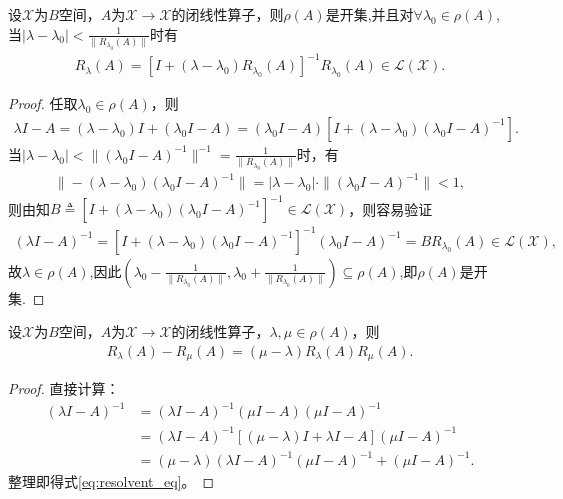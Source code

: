 \documentclass[../../main.tex]{subfiles}%
\begin{document}
\begin{corollary}
设$\mathscr{X}$为$B$空间，$A$为$\mathscr{X}\to \mathscr{X}$的闭线性算子，则$\rho(A)$是开集,并且对$\forall \lambda_0\in \rho(A)$,当$|\lambda - \lambda_0|<\frac{1}{\|R_{\lambda_0}(A)\|}$时有
\begin{align}\label{eq:rho_open}
R_{\lambda}(A)=\left[ I+\left( \lambda -\lambda _0 \right) R_{\lambda _0}\left( A \right) \right] ^{-1}R_{\lambda _0}\left( A \right) \in \mathscr{L} \left( \mathscr{X} \right) .
\end{align}
\end{corollary}
\begin{proof}
任取$\lambda_0\in\rho(A)$，则
\begin{align*}
\lambda I-A=(\lambda-\lambda_0)I+(\lambda_0 I-A)
=(\lambda_0 I-A)\left[I+(\lambda-\lambda_0)(\lambda_0 I-A)^{-1}\right].
\end{align*}
当$|\lambda-\lambda_0|<\|(\lambda_0 I-A)^{-1}\|^{-1}=\frac{1}{\|R_{\lambda_0}(A)\|}$时，有
\begin{align*}
\|-(\lambda-\lambda_0)(\lambda_0 I-A)^{-1}\|=|\lambda-\lambda_0|\cdot \|(\lambda_0 I-A)^{-1}\|<1,
\end{align*}
则由知$B\triangleq\left[I+(\lambda-\lambda_0)(\lambda_0 I-A)^{-1}\right]^{-1}\in\mathscr{L}(\mathscr{X})$，则容易验证
\begin{align*}
(\lambda I-A)^{-1}=\left[I+(\lambda-\lambda_0)(\lambda_0 I-A)^{-1}\right]^{-1}(\lambda_0 I-A)^{-1}=BR_{\lambda_0}(A)\in\mathscr{L}(\mathscr{X}),
\end{align*}
故$\lambda\in\rho(A)$,因此$\left( \lambda _0-\frac{1}{\|R_{\lambda_0}(A)\|},\lambda _0+\frac{1}{\|R_{\lambda_0}(A)\|}\right) \subseteq \rho \left( A \right) $,即$\rho(A)$是开集.
\end{proof}

\begin{lemma}[第一预解公式]\label{lemma:第一预解公式}
设$\mathscr{X}$为$B$空间，$A$为$\mathscr{X}\to \mathscr{X}$的闭线性算子，$\lambda,\mu\in\rho(A)$，则
\begin{align}
R_{\lambda}(A)-R_{\mu}(A)=(\mu-\lambda)R_{\lambda}(A)R_{\mu}(A).\label{eq:resolvent_eq}
\end{align}
\end{lemma}
\begin{proof}
直接计算：
\begin{align*}
(\lambda I-A)^{-1}&=(\lambda I-A)^{-1}(\mu I-A)(\mu I-A)^{-1}\\
&=(\lambda I-A)^{-1}\left[(\mu-\lambda)I+\lambda I-A\right](\mu I-A)^{-1}\\
&=(\mu-\lambda)(\lambda I-A)^{-1}(\mu I-A)^{-1}+(\mu I-A)^{-1}.
\end{align*}
整理即得式\eqref{eq:resolvent_eq}。
\end{proof}
\end{document}
